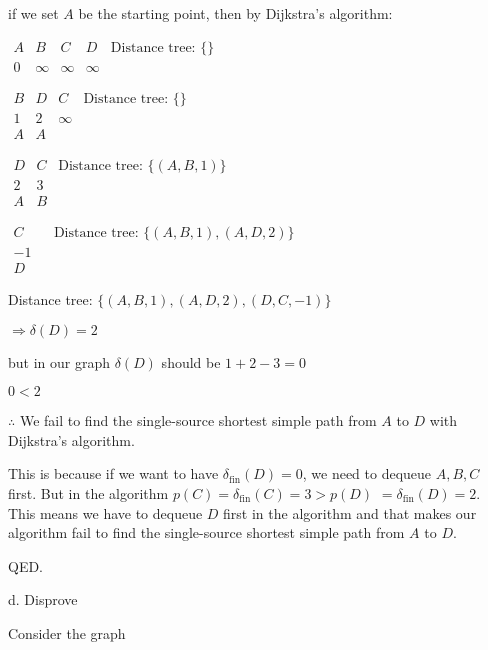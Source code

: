 \documentclass[12pt]{article}
\begin{document}
if we set $A$ be the starting point, then by Dijkstra's algorithm:


$\begin{array}{lllll}
A & B & C & D & \text{Distance tree: } \{\}\\
0 & \infty & \infty & \infty
\end{array}$


$\begin{array}{lllll}
B & D & C & \text{Distance tree: } \{\}\\
1 & 2 & \infty \\
A & A &
\end{array}$


$\begin{array}{lllll}
D & C & \text{Distance tree: } \{(A, B, 1)\}\\
2 & 3 &  \\
A & B &
\end{array}$


$\begin{array}{lllll}
C &  & \text{Distance tree: } \{(A, B, 1), (A, D, 2)\}\\
-1 &  &  \\
D &  &
\end{array}$

 Distance tree: $\{(A, B, 1) , (A, D, 2) , (D, C,-1)\}$

$\Rightarrow \delta(D)=2$

but in our graph $\delta(D)$ should be $1+2-3=0$ 

$0<2$

$\therefore$ We fail to find the single-source shortest simple path from $A$ to $D$ with Dijkstra's algorithm.

This is because if we want to have $\delta_{\text {fin}}(D)=0$, we need to dequeue $A ,  B ,  C$ first. But in the algorithm $p(C)=\delta_{\text {fin}}(C)=3>p(D)$ $=\delta_{\text {fin}}(D)=2$. This means we have to dequeue $D$ first in the algorithm and that makes our algorithm fail to find the single-source shortest simple path from $A$ to $D$.

QED.

d. Disprove 

Consider the graph
\begin{center}
\end{center}
\end{document}
